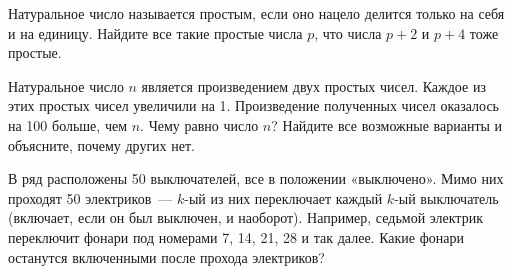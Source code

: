 ﻿
\begin{itemize}

\itA Натуральное число называется простым, если оно нацело делится только на себя и на единицу. Найдите все такие простые числа $p$, что числа $p+2$ и $p+4$ тоже простые.

\itB Натуральное число $n$ является произведением двух простых чисел. Каждое из этих простых чисел увеличили на 1. Произведение полученных чисел оказалось на 100 больше, чем $n$. Чему равно число $n$? Найдите все возможные варианты и объясните, почему других нет.

\itC В ряд расположены 50 выключателей, все в положении «выключено». Мимо них проходят 50 электриков~— $k$-ый из них переключает каждый $k$-ый выключатель (включает, если он был выключен, и наоборот). Например, седьмой электрик переключит фонари под номерами 7, 14, 21, 28 и так далее. Какие фонари останутся включенными после прохода электриков?
\end{itemize}